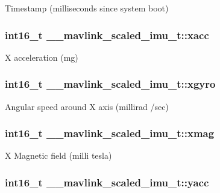 Timestamp (milliseconds since system boot) 

\hypertarget{struct____mavlink__scaled__imu__t_a2fe0911cd27268449b437b15d5bc8ab7}{
\subsubsection[{xacc}]{\setlength{\rightskip}{0pt plus 5cm}int16\+\_\+t \+\_\+\+\_\+mavlink\+\_\+scaled\+\_\+imu\+\_\+t\+::xacc}}\label{struct____mavlink__scaled__imu__t_a2fe0911cd27268449b437b15d5bc8ab7}


X acceleration (mg) 

\hypertarget{struct____mavlink__scaled__imu__t_aed9c79287653e608e2eef8b904189fae}{
\subsubsection[{xgyro}]{\setlength{\rightskip}{0pt plus 5cm}int16\+\_\+t \+\_\+\+\_\+mavlink\+\_\+scaled\+\_\+imu\+\_\+t\+::xgyro}}\label{struct____mavlink__scaled__imu__t_aed9c79287653e608e2eef8b904189fae}


Angular speed around X axis (millirad /sec) 

\hypertarget{struct____mavlink__scaled__imu__t_a600200625259b8ddc5702b2116e9d619}{
\subsubsection[{xmag}]{\setlength{\rightskip}{0pt plus 5cm}int16\+\_\+t \+\_\+\+\_\+mavlink\+\_\+scaled\+\_\+imu\+\_\+t\+::xmag}}\label{struct____mavlink__scaled__imu__t_a600200625259b8ddc5702b2116e9d619}


X Magnetic field (milli tesla) 

\hypertarget{struct____mavlink__scaled__imu__t_aa3c8baf85a0087a26c7be8d2203744f8}{
\subsubsection[{yacc}]{\setlength{\rightskip}{0pt plus 5cm}int16\+\_\+t \+\_\+\+\_\+mavlink\+\_\+scaled\+\_\+imu\+\_\+t\+::yacc}}\label{struct____mavlink__scaled__imu__t_aa3c8baf85a0087a26c7be8d2203744f8}


